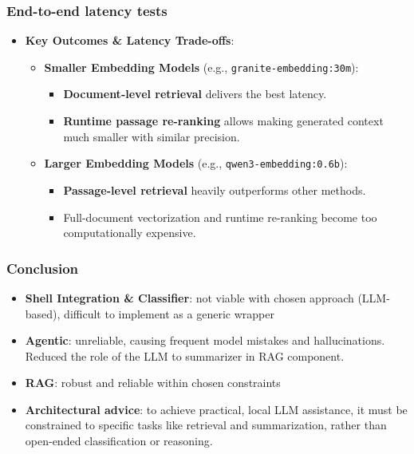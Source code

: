 \documentclass[10pt,aspectratio=169]{beamer}
\begin{document}
\begin{frame}
    \frametitle{End-to-end latency tests}
    \begin{itemize}
        \item \textbf{Key Outcomes \& Latency Trade-offs}:
        \begin{itemize}
            \item \textbf{Smaller Embedding Models} (e.g., \texttt{granite-embedding:30m}):
                \begin{itemize}
                    \item \textbf{Document-level retrieval} delivers the best latency.
                    \item \textbf{Runtime passage re-ranking} allows making generated
                context much smaller with similar precision.
                \end{itemize}
            \item \textbf{Larger Embedding Models} (e.g., \texttt{qwen3-embedding:0.6b}):
                \begin{itemize}
                    \item \textbf{Passage-level retrieval} heavily outperforms other methods.
                    \item Full-document vectorization and runtime re-ranking become too computationally expensive.
                \end{itemize}
        \end{itemize}
    \end{itemize}
\end{frame}

\begin{frame}
    \frametitle{Conclusion}
    \begin{itemize}
        \item \textbf{Shell Integration \& Classifier}: not viable with chosen
            approach (LLM-based), difficult to implement as a generic wrapper
        \item \textbf{Agentic}: unreliable, causing frequent model mistakes and
            hallucinations. Reduced the role of the LLM to summarizer in RAG
            component.
        \item \textbf{RAG}: robust and reliable within chosen constraints
            \vspace{0.5cm}
        \item \textbf{Architectural advice}: to achieve practical, local
            LLM assistance, it  must be constrained to specific tasks like
            retrieval and summarization, rather than open-ended classification
            or reasoning.
    \end{itemize}
\end{frame}
\end{document}
